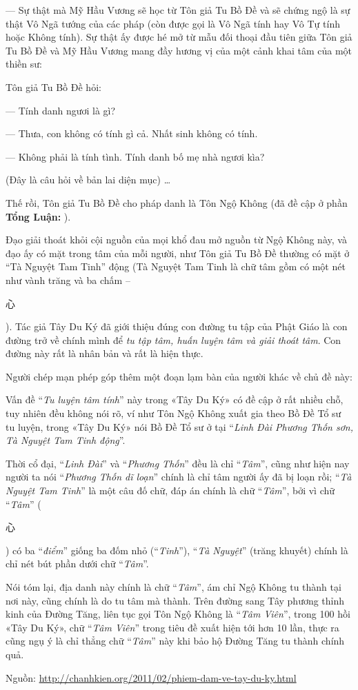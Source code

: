 — Sự thật mà Mỹ Hầu Vương sẽ học từ Tôn giả Tu Bồ Đề và sẽ chứng ngộ là sự thật Vô Ngã tướng của các pháp (còn được gọi là Vô Ngã tính hay Vô Tự tính hoặc Không tính). Sự thật ấy được hé mở từ mẫu đối thoại đầu tiên giữa Tôn giả Tu Bồ Đề và Mỹ Hầu Vương mang đầy hương vị của một cảnh khai tâm của một thiền sư:

Tôn giả Tu Bồ Đề hỏi:

— Tính danh ngươi là gì?

— Thưa, con không có tính gì cả. Nhất sinh không có tính.

— Không phải là tính tình. Tính danh bố mẹ nhà ngươi kìa?

(Đây là câu hỏi về bản lai diện mục) \ldots

Thế rồi, Tôn giả Tu Bồ Đề cho pháp danh là Tôn Ngộ Không (đã đề cập ở phần {\bf Tổng Luận:} ).

Đạo giải thoát khỏi cội nguồn của mọi khổ đau mở nguồn từ Ngộ Không này, và đạo ấy có mặt trong tâm của mỗi người, như Tôn giả Tu Bồ Đề thường có mặt ở ``Tà Nguyệt Tam Tinh'' động (Tà Nguyệt Tam Tinh là chữ tâm gồm có một nét như vành trăng và ba chấm -- \begin{CJK*}{UTF8}{bkai}心\end{CJK*}). Tác giả Tây Du Ký đã giới thiệu đúng con đường tu tập của Phật Giáo là con đường trở về chính mình để \emph{tu tập tâm, huấn luyện tâm và giải thoát tâm}. Con đường này rất là nhân bản và rất là hiện thực.

\hrulefill

\begin{small}
Người chép mạn phép góp thêm một đoạn lạm bàn của người khác về chủ đề này:

Vấn đề ``\emph{Tu luyện tâm tính}'' này trong «Tây Du Ký» có đề cập ở rất nhiều chỗ, tuy nhiên đều không nói rõ, ví như Tôn Ngộ Không xuất gia theo Bồ Đề Tổ sư tu luyện, trong «Tây Du Ký» nói Bồ Đề Tổ sư ở tại ``\emph{Linh Đài Phương Thốn sơn, Tà Nguyệt Tam Tinh động}''.

Thời cổ đại, ``\emph{Linh Đài}'' và ``\emph{Phương Thốn}'' đều là chỉ ``\emph{Tâm}'', cũng như hiện nay người ta nói ``\emph{Phương Thốn dĩ loạn}'' chính là chỉ tâm người ấy đã bị loạn rồi; ``\emph{Tà Nguyệt Tam Tinh}'' là một câu đố chữ, đáp án chính là chữ ``\emph{Tâm}'', bởi vì chữ ``\emph{Tâm}'' (\begin{CJK*}{UTF8}{bkai}心\end{CJK*}) có ba ``\emph{điểm}'' giống ba đốm nhỏ (``\emph{Tinh}''), ``\emph{Tà Nguyệt}'' (trăng khuyết) chính là chỉ nét bút phần dưới chữ ``\emph{Tâm}''.

Nói tóm lại, địa danh này chính là chữ ``\emph{Tâm}'', ám chỉ Ngộ Không tu thành tại nơi này, cũng chính là do tu tâm mà thành. Trên đường sang Tây phương thỉnh kinh của Đường Tăng, liên tục gọi Tôn Ngộ Không là ``\emph{Tâm Viên}'', trong 100 hồi «Tây Du Ký», chữ ``\emph{Tâm Viên}'' trong tiêu đề xuất hiện tới hơn 10 lần, thực ra cũng ngụ ý là chỉ thẳng chữ ``\emph{Tâm}'' này khi bảo hộ Đường Tăng tu thành chính quả.

Nguồn: \href{http://chanhkien.org/2011/02/phiem-dam-ve-tay-du-ky.html}{http://chanhkien.org/2011/02/phiem-dam-ve-tay-du-ky.html}
\end{small}

